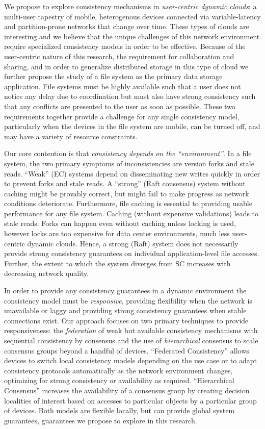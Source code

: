\documentclass{article}
\begin{document}
We propose to explore consistency mechanisms in \textit{user-centric dynamic clouds}: a multi-user tapestry of mobile, heterogenous devices connected via variable-latency and partition-prone networks that change over time. These types of clouds are interesting and we believe that the unique challenges of this network environment require specialized consistency models in order to be effective. Because of the user-centric nature of this research, the requirement for collaboration and sharing, and in order to generalize distributed storage in this type of cloud we further propose the study of a file system as the primary data storage application. File systems must be highly available such that a user does not notice any delay due to coordination but must also have strong consistency such that any conflicts are presented to the user as soon as possible. These two requirements together provide a challenge for any single consistency model, particularly when the devices in the file system are mobile, can be turned off, and may have a variety of resource constraints.

Our core contention is that \emph{consistency depends on the
``environment''}. In a file system, the two primary symptoms of inconsistencies are version forks and stale reads. ``Weak'' (EC) systems depend on disseminating new writes quickly in order to prevent forks and stale reads. A ``strong'' (Raft consensus) system without caching might be provably correct, but might fail to make progress as network conditions deteriorate. Furthermore, file caching is essential to providing usable performance for any file system. Caching (without expensive validations) leads to stale reads. Forks can happen even without caching unless locking is used, however locks are too expensive for data center environments, much less user-centric dynamic clouds. Hence, a strong (Raft) system does not necessarily provide strong consistency guarantees on individual application-level file accesses. Further, the extent to which the system diverges from SC increases with decreasing network quality.

In order to provide any consistency guarantees in a dynamic environment the consistency model must be \textit{responsive}, providing flexibility when the network is unavailable or laggy and providing strong consistency guarantees when stable connections exist. Our approach focuses on two primary techniques to provide responsiveness: the \textit{federation} of weak but available consistency mechanisms with sequential consistency by consensus and the use of \textit{hierarchical} consensus to scale consensus groups beyond a handful of devices. ``Federated Consistency'' allows devices to switch local consistency models depending on the use case or to adapt consistency protocols automatically as the network environment changes, optimizing for strong consistency or availability as required. ``Hierarchical Consensus'' increases the availability of a consensus group by creating decision localities of interest based on accesses to particular objects by a particular group of devices. Both models are flexible locally, but can provide global system guarantees, guarantees we propose to explore in this research.
\end{document}
